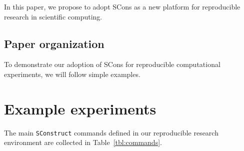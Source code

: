In this paper, we propose to adopt SCons as a new platform for
reproducible research in scientific computing.

\subsection{Paper organization}

To demonstrate our adoption of SCons for reproducible computational
experiments, we will follow simple examples. 

\begin{comment}
\newpage
\section{Madagascar open source code}
%
Madagascar's homepage is \url{http://rsf.sourceforge.net}. Madagascar
source code is proposed in two versions:
\href{https://sourceforge.net/project/showfiles.php?group_id=162909}{stable}
and
\href{http://rsf.sourceforge.net/wiki/index.php/Svn-url}{development}.
The stable version is a snapshot of Madagascar at a given time. It was
installed on different platforms and tested before being released.
Updates are typically done every few months as opposed to the
development version which is updated every few hours or days by a
dynamic team of developers. As such, there is no guarantee that the
development version will be fully functional and stable at any given
point in time. In the remaining of this paper, we assume that you have
successfully installed Madagascar stable version and that you have an
Internet connection\footnote{XXX provide alternate mean to download
  Lena.img if no Internet connection XXX}.
\end{comment}

\section{Example experiments}

%
The main \texttt{SConstruct} commands defined in our reproducible
research environment are collected in Table~\ref{tbl:commands}.

